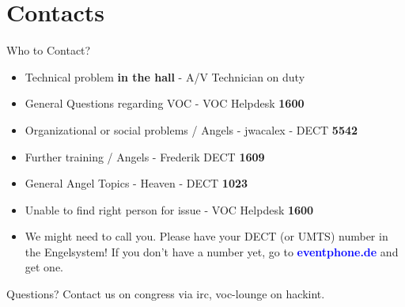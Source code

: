 \documentclass[aspectratio=169]{beamer}
\begin{document}
\section{Contacts}			%
\begin{frame}{Who to Contact?}
\begin{itemize}
	\item Technical problem \textbf{in the hall} - A/V Technician on duty
	\item General Questions regarding VOC - VOC Helpdesk \textbf{1600}
	\item Organizational or social problems / Angels - jwacalex - DECT \textbf{5542}
	\item Further training / Angels - Frederik DECT \textbf{1609}
	\item General Angel Topics - Heaven - DECT \textbf{1023}
	\item Unable to find right person for issue - VOC Helpdesk \textbf{1600}
	\item We might need to call you. Please have your DECT (or UMTS) number in the Engelsystem! If you don't have a number yet, go to 
	\textcolor{blue}{\textbf{eventphone.de}} and get one. 
\end{itemize} 
\end{frame}

\begin{frame}{Questions?}
Contact us on congress via irc, voc-lounge on hackint.
\end{frame}
\end{document}
